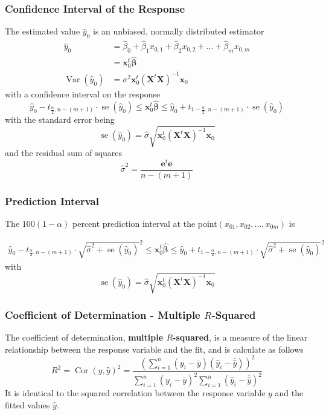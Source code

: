 \documentclass[11pt]{article}
\theoremstyle{definition}
\newcommand*\samplemean[1]{\overline{#1}}
\newcommand*\Cor[1]{\mathop{\text{Cor}}\left(#1\right)}
\newcommand*\Var[1]{\mathop{\text{Var}}\left(#1\right)}
\newcommand*\se[1]{\mathop{\text{se}}\left(#1\right)}
\begin{document}
\subsubsection{Confidence Interval of the Response}
The estimated value $\hat{y}_0$ is an unbiased, normally distributed estimator
\begin{align*}
	\hat{y}_0 &= \hat{\beta}_0 + \hat{\beta}_1 x_{0,1} + \hat{\beta}_2 x_{0,2} + \dots + \hat{\beta}_m x_{0,m}\\
	&=\bm{x}_0^t \hat{\bm{\beta}}\\
	\Var{\hat{y}_0} &= \sigma^2 \bm{x}_0^t(\bm{X}^t\bm{X})^{-1}\bm{x}_0
\end{align*}
with a confidence interval on the response
\begin{equation*}
	\hat{y}_0 - t_{\frac{\alpha}{2},n-(m+1)}\cdot\se{\hat{y}_0} \leq \bm{x}_0^t\hat{\bm{\beta}} \leq \hat{y}_0 + t_{1 - \frac{\alpha}{2},n-(m+1)}\cdot\se{\hat{y}_0}
\end{equation*}
with the standard error being
\begin{equation*}
	\se{\hat{y}_0} = \hat{\sigma}\sqrt{\bm{x}_0^t(\bm{X}^t\bm{X})^{-1}\bm{x}_0}
\end{equation*}
and the residual sum of squares
\begin{equation*}
	\hat{\sigma}^2 = \frac{\bm{e}^t\bm{e}}{n-(m+1)}
\end{equation*}

\subsubsection{Prediction Interval}
The $100(1-\alpha)$ percent prediction interval at the point$(x_{01},x_{02},\dots,x_{0m})$ is

\begin{align*}
	\hat{y}_0 - t_{\frac{\alpha}{2},n-(m+1)}\cdot\sqrt{\hat{\sigma}^2+\se{\hat{y}_0}}^2 \leq \bm{x}_0^t\hat{\bm{\beta}} \leq \hat{y}_0 + t_{1 - \frac{\alpha}{2},n-(m+1)}\cdot\sqrt{\hat{\sigma}^2+\se{\hat{y}_0}}^2
\end{align*}
with
\begin{equation*}
	\se{\hat{y}_0} = \hat{\sigma}\sqrt{\bm{x}_0^t(\bm{X}^t\bm{X})^{-1}\bm{x}_0}
\end{equation*}

\subsubsection{Coefficient of Determination - Multiple $R$-Squared}
The coefficient of determination, \textbf{multiple $R$-squared}, is a measure of the linear relationship between the response variable and the fit, and is calculate as follows
\begin{equation*}
	R^2 = \Cor{y,\hat{y}}^2 = \frac{\left(\sum_{i=1}^{n}(y_i - \samplemean{y})(\hat{y}_i - \samplemean{\hat{y}})\right)^2}{\sum_{i=1}^n(y_i - \samplemean{y})^2\sum_{i=1}^n(\hat{y}_i - \samplemean{\hat{y}})^2}
\end{equation*}
It is identical to the squared correlation between the response variable $y$ and the fitted values $\hat{y}$.
\end{document}
